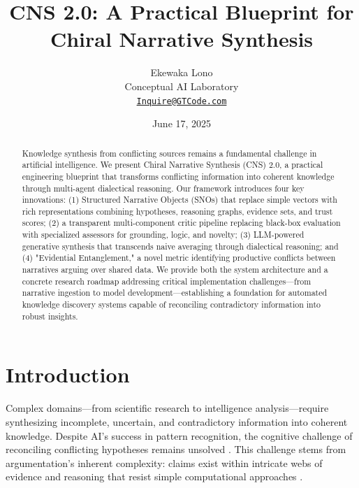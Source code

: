 \documentclass[12pt, a4paper]{article}
\title{\textbf{CNS 2.0: A Practical Blueprint for Chiral Narrative Synthesis}}
\author{
    Ekewaka Lono \\
    \small Conceptual AI Laboratory \\
    \small \href{mailto:inquire@gtcode.com}{\texttt{Inquire@GTCode.com}}
}
\date{June 17, 2025}
\begin{document}
\maketitle
\vspace{-2em}

\begin{abstract}
Knowledge synthesis from conflicting sources remains a fundamental challenge in artificial intelligence. We present Chiral Narrative Synthesis (CNS) 2.0, a practical engineering blueprint that transforms conflicting information into coherent knowledge through multi-agent dialectical reasoning. Our framework introduces four key innovations: (1) Structured Narrative Objects (SNOs) that replace simple vectors with rich representations combining hypotheses, reasoning graphs, evidence sets, and trust scores; (2) a transparent multi-component critic pipeline replacing black-box evaluation with specialized assessors for grounding, logic, and novelty; (3) LLM-powered generative synthesis that transcends naive averaging through dialectical reasoning; and (4) "Evidential Entanglement," a novel metric identifying productive conflicts between narratives arguing over shared data. We provide both the system architecture and a concrete research roadmap addressing critical implementation challenges—from narrative ingestion to model development—establishing a foundation for automated knowledge discovery systems capable of reconciling contradictory information into robust insights.
\end{abstract}

\section{Introduction}
Complex domains—from scientific research to intelligence analysis—require synthesizing incomplete, uncertain, and contradictory information into coherent knowledge. Despite AI's success in pattern recognition, the cognitive challenge of reconciling conflicting hypotheses remains unsolved \cite{Boström2017}. This challenge stems from argumentation's inherent complexity: claims exist within intricate webs of evidence and reasoning that resist simple computational approaches \cite{Toulmin2003}. 
\end{document}
